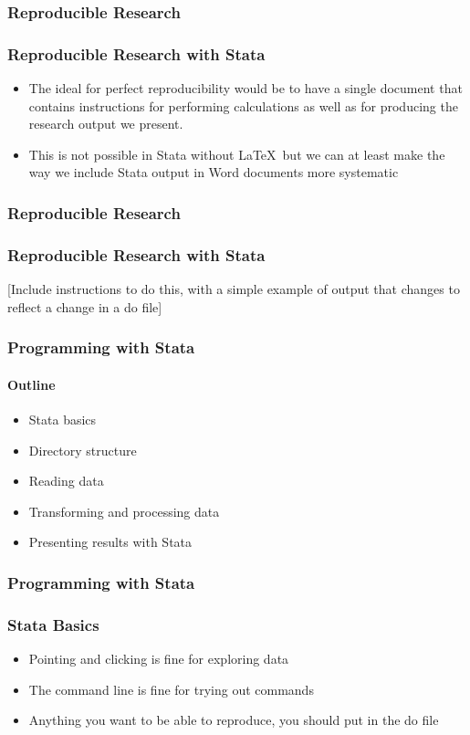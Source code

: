 \documentclass{beamer}
\begin{document}
\begin{frame}
  \frametitle{Reproducible Research}
  \frametitle{Reproducible Research with Stata}
  \begin{itemize}
    \item The ideal for perfect reproducibility would be to have a single document that contains instructions for performing calculations as well as for producing the research output we present.
    \item This is not possible in Stata without \LaTeX\ but we can at least make the way we include Stata output in Word documents more systematic
  \end{itemize}
\end{frame}

\begin{frame}
  \frametitle{Reproducible Research}
  \frametitle{Reproducible Research with Stata}
  [Include instructions to do this, with a simple example of output that changes to reflect a change in a do file]
\end{frame}

\begin{frame}
  \frametitle{Programming with Stata}
  \framesubtitle{Outline}
  \begin{itemize}
    \item Stata basics
    \item Directory structure
    \item Reading data
    \item Transforming and processing data
    \item Presenting results with Stata
  \end{itemize}
\end{frame}

\begin{frame}
  \frametitle{Programming with Stata}
  \frametitle{Stata Basics}
  \begin{itemize}
    \item Pointing and clicking is fine for exploring data
    \item The command line is fine for trying out commands
    \item Anything you want to be able to reproduce, you should put in the do file
  \end{itemize}
\end{frame}
\end{document}
